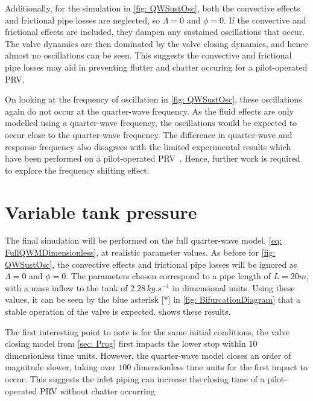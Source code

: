 Additionally, for the simulation in \cref{fig: QWSustOsc}, both the convective effects and frictional pipe losses are neglected, so $\Lambda = 0$ and $\phi = 0$. If the convective and frictional effects are included, they dampen any sustained oscillations that occur. The valve dynamics are then dominated by the valve closing dynamics, and hence almost no oscillations can be seen. This suggests the convective and frictional pipe losses may aid in preventing flutter and chatter occuring for a pilot-operated PRV.

On looking at the frequency of oscillation in \cref{fig: QWSustOsc}, these oscillations again do not occur at the quarter-wave frequency. As the fluid effects are only modelled using a quarter-wave frequency, the oscillations would be expected to occur close to the quarter-wave frequency. The difference in quarter-wave and response frequency also disagrees with the limited experimental results which have been performed on a pilot-operated PRV~\cite{Allison2015TestingValves}. Hence, further work is required to explore the frequency shifting effect.

\section{Variable tank pressure}

The final simulation will be performed on the full quarter-wave model, \cref{eq: FullQWMDimensionless}, at realistic parameter values. As before for \cref{fig: QWSustOsc}, the convective effects and frictional pipe losses will be ignored as $\Lambda = 0$ and $\phi = 0$. The parameters chosen correspond to a pipe length of $L = 20 \si{m}$, with a mass inflow to the tank of $2.28 \, \si{kg.s^{-1}}$ in dimensional units. Using these values, it can be seen by the blue asterisk [\textcolor{Blue}{$*$}] in \cref{fig: BifurcationDiagram} that a stable operation of the valve is expected.  shows these results.
~


The first interesting point to note is for the same initial conditions, the valve closing model from \cref{sec: Prog} first impacts the lower stop within $10$ dimensionless time units. However, the quarter-wave model closes an order of magnitude slower, taking over $100$ dimensionless time units for the first impact to occur. This suggests the inlet piping can increase the closing time of a pilot-operated PRV without chatter occurring.


